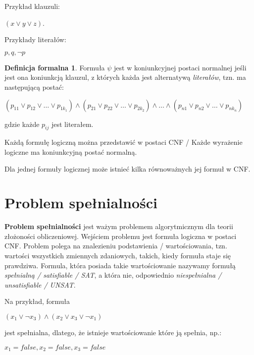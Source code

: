 \documentclass[a4paper,12pt,oneside]{book}
\theoremstyle{definition}
\newtheorem*{formal}{Definicja formalna}
\begin{document}
Przykład klauzuli:

\begin{center}
    $(x \lor y \lor z)$. 
\end{center}

Przykłady literałów:

\begin{center}
    $p, q, \neg p$
\end{center}

\begin{formal}
    Formuła $\psi$ jest w koniunkcyjnej postaci normalnej jeśli jest ona koniunkcją klauzul, z których każda jest alternatywą \textit{literałów}, tzn. ma następującą postać: 
    \begin{center}
    $(p_{11} \lor p_{12} \lor \ldots \lor p_{1{k_1}}) \land (p_{21} \lor p_{22} \lor \ldots \lor p_{2{k_2}}) \land \ldots \land (p_{n1} \lor p_{n2} \lor \ldots \lor p_{n{k_n}})$
    \end{center}
    gdzie każde $p_{ij}$ jest literałem.
\end{formal}

Każdą formułę logiczną można przedstawić w postaci CNF / Każde wyrażenie logiczne ma koniunkcyjną postać normalną.

Dla jednej formuły logicznej może istnieć kilka równoważnych jej formuł w CNF.  

\section{Problem spełnialności}

\textbf{Problem spełnialności} jest ważym problemem algorytmicznym dla teorii złożoności obliczeniowej. Wejściem problemu jest formuła logiczna w postaci CNF. Problem polega na znalezieniu podstawienia / wartościowania, tzn. wartości wszystkich zmiennych zdaniowych, takich, kiedy formuła staje się prawdziwa. Formula, która posiada takie wartościowanie nazywamy formułą \textit{spełnialną / satisfiable / SAT}, a która nie, odpowiednio \textit{niespełnialna / unsatisfiable / UNSAT}.

Na przykład, formuła
\begin{center}
    $(x_1 \lor \neg x_3) \land (x_2 \lor x_3 \lor \neg x_1)$
\end{center}

jest spełnialna, dlatego, że istnieje wartościowanie które ją spełnia, np.:
\begin{center}
    $x_1 = false, x_2 = false, x_3 = false$
\end{center}
\end{document}
